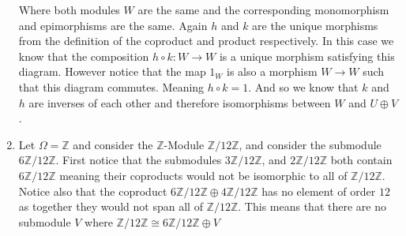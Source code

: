 \documentclass[12pt]{amsart}
\theoremstyle{definition}
\newcommand{\Z}{\mathbb{Z}}
\newcommand{\ra}{\rightarrow}
\begin{document}
\begin{enumerate}
Where both modules $W$ are the same and the corresponding monomorphism and epimorphisms are the same. Again $h$ and $k$ are the unique morphisms from the definition of the coproduct and product respectively. In this case we know that the composition $h\circ k: W\ra W$ is a unique morphism satisfying this diagram. However notice that the map $1_W$ is also a morphism $W\ra W$ such that this diagram commutes. Meaning $h\circ k=1$. And so we know that $k$ and $h$ are inverses of each other and therefore isomorphisms between $W$ and $U\oplus V$. \\

\item Let $\Omega=\Z$ and consider the $\Z$-Module $\Z/12\Z$, and consider the submodule $6\Z/12\Z$. First notice that the submodules $3\Z/12\Z$, and $2\Z/12\Z$ both contain $6\Z/12\Z$ meaning their coproducts would not be isomorphic to all of $\Z/12\Z$. Notice also that the coproduct $6\Z/12\Z \oplus 4\Z/12\Z$ has no element of order $12$ as together they would not span all of $\Z/12\Z$. This means that there are no submodule $V$ where $\Z/12\Z\cong 6\Z/12\Z\oplus V$

    
\end{enumerate}
\end{document}
